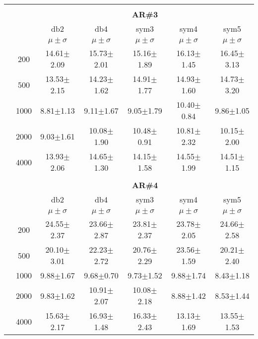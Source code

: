 \begin{table}[H]
\begin{tabular}{|c|c|c c c c c|}
\\ \midrule
\multicolumn{7}{c}{}\\ 



\cline{3-7}
\multicolumn{2}{c|}{\multirow{3}{*}{}} & \multicolumn{5}{c|}{\textbf{AR\#3}}   \\\cline{3-7} 

\multicolumn{2}{c|}{}  & db2 & db4 & sym3 & sym4 & sym5 \\\cline{3-7}
\multicolumn{2}{c|}{}& $\mu \pm \sigma$ & $\mu \pm \sigma$ & $\mu \pm \sigma$ & $\mu \pm \sigma$ & $\mu \pm \sigma$ \\\hline

\multicolumn{1}{|c|}{ \multirow{5}{*}{\rotatebox[origin=c]{90}{\textbf{Neurônios}}} }
&200	&14.61$\pm$2.09	&15.73$\pm$2.01	&15.16$\pm$1.89	&16.13$\pm$1.45	&16.45$\pm$3.13	\\\cline{2-7}
&500	&13.53$\pm$2.15 &14.23$\pm$1.62	&14.91$\pm$1.77	&14.93$\pm$1.60	&14.73$\pm$3.20	\\\cline{2-7}
&1000	&8.81$\pm$1.13	&9.11$\pm$1.67	&9.05$\pm$1.79	&10.40$\pm$0.84	&9.86$\pm$1.05	\\\cline{2-7}
&2000	&9.03$\pm$1.61	&10.08$\pm$1.90	&10.48$\pm$0.91	&10.81$\pm$2.32	&10.15$\pm$2.00	\\\cline{2-7}
&4000	&13.93$\pm$2.06	&14.65$\pm$1.30	&14.15$\pm$1.58	&14.55$\pm$1.99	&14.51$\pm$1.15	


\\\midrule 
\multicolumn{7}{c}{}\\ 



\cline{3-7}
\multicolumn{2}{c|}{\multirow{3}{*}{}} & \multicolumn{5}{c|}{\textbf{AR\#4}}   \\\cline{3-7} 

\multicolumn{2}{c|}{}  & db2 & db4 & sym3 & sym4 & sym5 \\\cline{3-7}
\multicolumn{2}{c|}{}& $\mu \pm \sigma$ & $\mu \pm \sigma$ & $\mu \pm \sigma$ & $\mu \pm \sigma$ & $\mu \pm \sigma$ \\\hline

\multicolumn{1}{|c|}{ \multirow{5}{*}{\rotatebox[origin=c]{90}{\textbf{Neurônios}}} }
&200	&24.55$\pm$2.37	&23.66$\pm$2.87	&23.81$\pm$2.37	&23.78$\pm$2.05	&24.66$\pm$2.58	\\\cline{2-7}
&500	&20.10$\pm$3.01	&22.23$\pm$2.72	&20.76$\pm$2.29	&23.56$\pm$1.59	&20.21$\pm$2.40	\\\cline{2-7}
&1000	&9.88$\pm$1.67	&9.68$\pm$0.70	&9.73$\pm$1.52	&9.88$\pm$1.74	&8.43$\pm$1.18	\\\cline{2-7}
&2000	&9.83$\pm$1.62	&10.91$\pm$2.07	&10.08$\pm$2.18	&8.88$\pm$1.42	&8.53$\pm$1.44	\\\cline{2-7}
&4000	&15.63$\pm$2.17	&16.93$\pm$1.48	&16.33$\pm$2.43	&13.13$\pm$1.69	&13.55$\pm$1.53	
\\\midrule
	\end{tabular}

\end{table}

